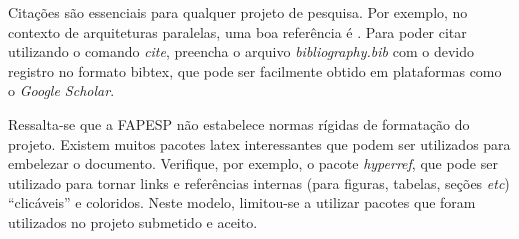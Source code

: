 Citações são essenciais para qualquer projeto de pesquisa. Por exemplo, no contexto de arquiteturas paralelas, uma boa referência é \cite{tanenbaum2016structured}. Para poder citar utilizando o comando \textit{cite}, preencha o arquivo \textit{bibliography.bib} com o devido registro no formato bibtex, que pode ser facilmente obtido em plataformas como o \textit{Google Scholar}.

Ressalta-se que a FAPESP não estabelece normas rígidas de formatação do projeto. Existem muitos pacotes latex interessantes que podem ser utilizados para embelezar o documento. Verifique, por exemplo, o pacote \textit{hyperref}, que pode ser utilizado para tornar links e referências internas (para figuras, tabelas, seções \textit{etc}) ``clicáveis'' e coloridos. Neste modelo, limitou-se a utilizar pacotes que foram utilizados no projeto submetido e aceito.